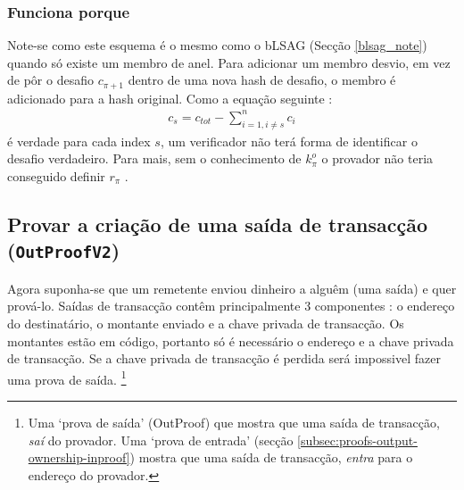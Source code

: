 \subsubsection*{Funciona porque}

Note-se como este esquema é o mesmo como o bLSAG (Secção \ref{blsag_note}) quando só existe um membro de anel. Para adicionar um membro desvio, em vez de pôr o desafio $c_{\pi+1}$ dentro de uma nova hash de desafio, o membro é adicionado para a hash original. Como a equação seguinte :
\begin{align*}
c_{s} = c_{tot} - \sum^{n}_{i=1,i\neq s} c_i
\end{align*}
é verdade para cada index $s$, um verificador não terá forma de identificar o desafio verdadeiro. Para mais, sem o conhecimento de $k^o_{\pi}$ o provador não teria conseguido definir $r_{\pi}$ .




\subsection{Provar a criação de uma saída de transacção ({\tt OutProofV2})}
\label{subsec:proofs-output-creator-outproof}

Agora suponha-se que um remetente enviou dinheiro a alguêm (uma saída) e quer prová-lo. 
Saídas de transacção contêm principalmente 3 componentes : o endereço do destinatário, o montante enviado e a chave privada de transacção. Os montantes estão em código, portanto só é necessário o endereço e a chave privada de transacção. Se a chave privada de transacção é perdida será impossivel fazer uma prova de saída.   
\footnote{Uma `prova de saída' (OutProof) que mostra que uma saída de transacção, {\em saí} do provador. Uma `prova de entrada' (secção \ref{subsec:proofs-output-ownership-inproof}) mostra que uma saída de transacção, {\em entra} para o endereço do provador.}

